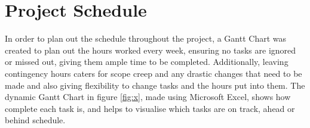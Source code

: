 \documentclass[12pt]{article}
\begin{document}
 

\section{Project Schedule}

In order to plan out the schedule throughout the project, a Gantt Chart was created to plan out the hours worked every week, ensuring no tasks are ignored or missed out, giving them ample time to be completed. Additionally, leaving contingency hours caters for scope creep and any drastic changes that need to be made and also giving flexibility to change tasks and the hours put into them. The dynamic Gantt Chart in  figure \ref{fig:x}, made using Microsoft Excel, shows how complete each task is, and helps to visualise which tasks are on track, ahead or behind schedule. 
\end{document}
